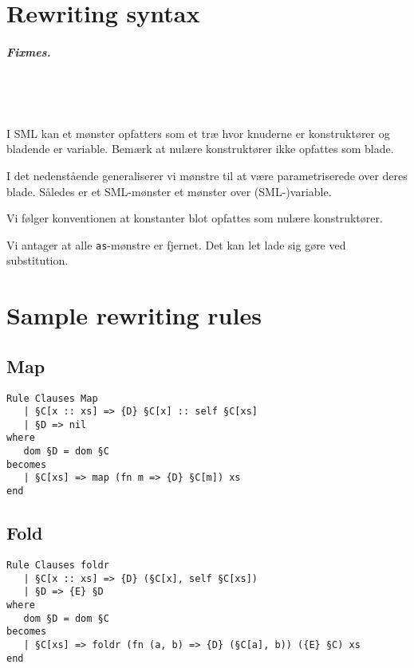 \documentclass[oneside]{memoir}
\theoremstyle{definition}
\begin{document}
\listoffixmes{}

\chapter{Rewriting syntax}

\paragraph{Fixmes.} \ \\
 \ \\

 \ \\

I SML kan et mønster opfatters som et træ hvor knuderne er konstruktører og
bladende er variable. Bemærk at nulære konstruktører ikke opfattes som blade.

I det nedenstående generaliserer vi mønstre til at være parametriserede over
deres blade. Således er et SML-mønster et mønster over (SML-)variable.

Vi følger konventionen at konstanter blot opfattes som nulære konstruktører.

Vi antager at alle \texttt{as}-mønstre er fjernet. Det kan let lade sig gøre ved
substitution.












\appendix

\chapter{Sample rewriting rules}

\section{Map}


\begin{verbatim}
Rule Clauses Map
   | §C[x :: xs] => {D} §C[x] :: self §C[xs]
   | §D => nil
where
   dom §D = dom §C
becomes
   | §C[xs] => map (fn m => {D} §C[m]) xs
end
\end{verbatim}


\section{Fold}

\begin{verbatim}
Rule Clauses foldr
   | §C[x :: xs] => {D} (§C[x], self §C[xs])
   | §D => {E} §D
where
   dom §D = dom §C
becomes
   | §C[xs] => foldr (fn (a, b) => {D} (§C[a], b)) ({E} §C) xs
end
\end{verbatim}
\end{document}

